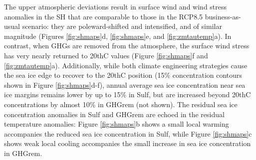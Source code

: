 \documentclass[draft,grl]{AGUTeX}  %
\begin{document}
\begin{article}
The upper atmospheric deviations result in surface wind and wind stress anomalies in the SH that are comparable to those in the RCP8.5 business-as-usual scenario: they are poleward-shifted and intensified, and of similar magnitude (Figures \ref{fig:shmaps}d, \ref{fig:shmaps}e, and \ref{fig:zmtautemp}a). In contrast, when GHGs are removed from the atmosphere, the surface wind stress has very nearly returned to 20thC values (Figure \ref{fig:shmaps}f and \ref{fig:zmtautemp}a). Additionally, while both climate engineering strategies cause the sea ice edge to recover to the 20thC position (15\% concentration contours shown in Figure \ref{fig:shmaps}d-f), annual average sea ice concentration near sea ice margins remains lower by up to 15\% in Sulf, but are increased beyond 20thC concentrations by almost 10\% in GHGrem (not shown). The residual sea ice concentration anomalies in Sulf and GHGrem are echoed in the residual temperature anomalies: Figure \ref{fig:shmaps}b shows a small local warming accompanies the reduced sea ice concentration in Sulf, while Figure \ref{fig:shmaps}c shows weak local cooling accompanies the small increase in sea ice concentration in  GHGrem. %


\end{article}
\end{document}
